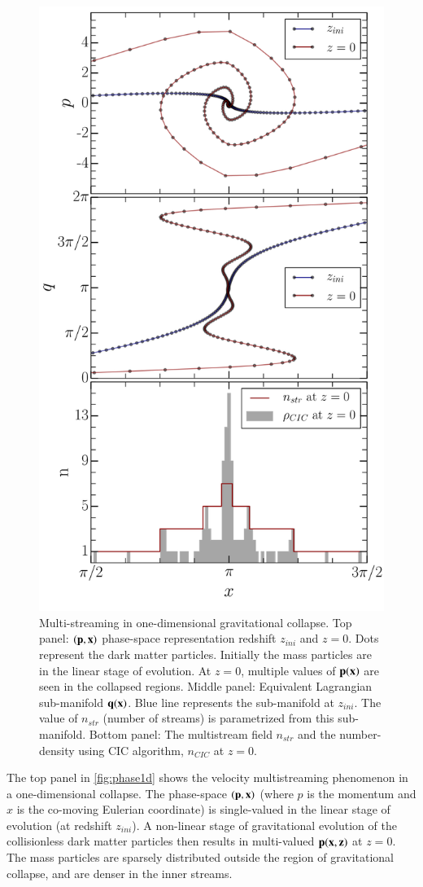 \begin{figure}
\begin{minipage}[t]{.99\linewidth}
  \centering\includegraphics[width=8.cm]{Chapter4/Source_v2/fig13.pdf} 
\end{minipage}\hfill
\caption{ Multi-streaming in one-dimensional gravitational collapse. Top panel: $(\bf{p}, \bf{x})$ phase-space representation redshift $z_{ini}$ and $z = 0$. Dots represent the dark matter particles. Initially the mass particles are in the linear stage of evolution. At $z = 0$, multiple values of $\bf{p}(\bf{x})$ are seen in the collapsed regions. Middle panel: Equivalent Lagrangian sub-manifold $\bf{q}(\bf{x})$. Blue line represents the sub-manifold at $z_{ini}$. The value of $n_{str}$ (number of streams) is parametrized from this sub-manifold. Bottom panel: The multistream field $n_{str}$ and the number-density using CIC algorithm, $n_{CIC}$ at $z = 0$. }
\label{fig:phase1d}
\end{figure}

The top panel in \autoref{fig:phase1d} shows the velocity multistreaming phenomenon in a one-dimensional collapse. The phase-space $(\bf{p}, \bf{x})$ (where $p$ is the momentum and $x$ is the co-moving Eulerian coordinate) is single-valued in the linear stage of evolution (at redshift $z_{ini}$). A non-linear stage of gravitational evolution of the collisionless dark matter particles then results in multi-valued $\bf{p} (\bf{x},z)$ at $z = 0$. The mass particles are sparsely  distributed outside the region of gravitational collapse, and are denser in the inner streams.

